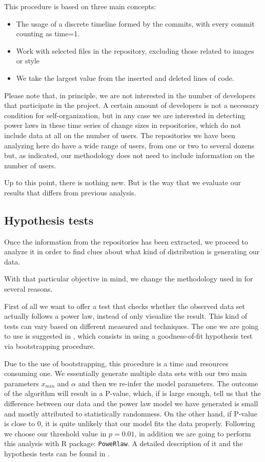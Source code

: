 \documentclass{article}
\begin{document}
This procedure is based on three main concepts:
\begin{itemize}
\item The usage of a discrete timeline formed by the commits, with
  every commit counting as time=1.
\item Work with selected files in the repository, excluding those
  related to images or style
\item We take the largest value from the inserted and deleted lines of
  code.
\end{itemize}

Please note that, in principle, we are not interested in the number of developers that participate in the project. A certain amount of developers is not a necessary condition for self-organization, but in any case we are interested in detecting power laws in these time series of change sizes in repositories, which do not include data at all on the number of users. The repositories we have been analyzing here do have a wide range of users, from one or two to several dozens but, as indicated, our methodology does not need to include information on the number of users.

Up to this point, there is nothing new. But is the way that we
evaluate our results that differs from previous analysis.

\subsection{Hypothesis tests}

Once the information from the repositories has been extracted, we
proceed to analyze it in order to find clues about what kind of
distribution is generating our data.

With that particular objective in mind, we change the methodology used
in \cite{merelo2017self} for several reasons.

First of all we want to offer a test that checks whether the observed
data set actually follows a power law, instead of only visualize the
result.  This kind of tests can vary based on different measured and
techniques. The one we are going to use is suggested in
\cite{clauset2009power}, which consists in using a goodness-of-fit
hypothesis test via bootstrapping procedure.

Due to the use of bootstrapping, this procedure is a time and
resources consuming one.  We essentially generate multiple data sets
with our two main parameters $x_{min}$ and $\alpha$ and then we
re-infer the model parameters. The outcome of the algorithm will
result in a P-value, which, if is large enough, tell us that the
difference between our data and the power law model we have generated
is small and mostly attributed to statistically randomness. On the
other hand, if P-value is close to 0, it is quite unlikely that our
model fits the data properly.  Following \cite{clauset2009power} we
choose our threshold value in $p=0.01$, in addition we are going to
perform this analysis with R package: {\tt PoweRlaw}. A detailed description
of it and the hypothesis tests can be found in
\cite{gillespie2015power}.
\end{document}
